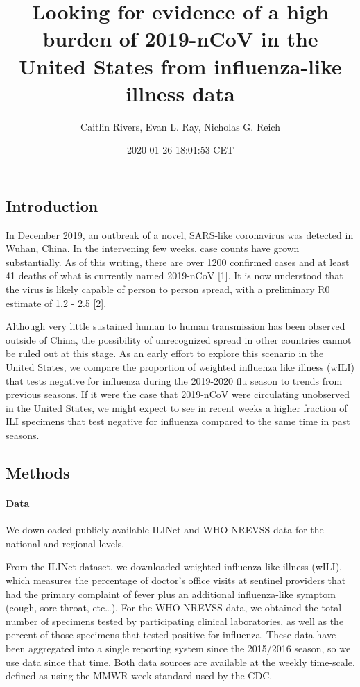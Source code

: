 \documentclass[]{article}
\title{Looking for evidence of a high burden of 2019-nCoV in the United States
from influenza-like illness data}
\author{Caitlin Rivers, Evan L. Ray, Nicholas G. Reich}
\date{2020-01-26 18:01:53 CET}
\let\oldparagraph\paragraph
\renewcommand{\paragraph}[1]{\oldparagraph{#1}\mbox{}}
\begin{document}
\maketitle

\hypertarget{introduction}{%
\subsection{Introduction}\label{introduction}}

In December 2019, an outbreak of a novel, SARS-like coronavirus was
detected in Wuhan, China. In the intervening few weeks, case counts have
grown substantially. As of this writing, there are over 1200 confirmed
cases and at least 41 deaths of what is currently named 2019-nCoV
{[}1{]}. It is now understood that the virus is likely capable of person
to person spread, with a preliminary R0 estimate of 1.2 - 2.5 {[}2{]}.

Although very little sustained human to human transmission has been
observed outside of China, the possibility of unrecognized spread in
other countries cannot be ruled out at this stage. As an early effort to
explore this scenario in the United States, we compare the proportion of
weighted influenza like illness (wILI) that tests negative for influenza
during the 2019-2020 flu season to trends from previous seasons. If it
were the case that 2019-nCoV were circulating unobserved in the United
States, we might expect to see in recent weeks a higher fraction of ILI
specimens that test negative for influenza compared to the same time in
past seasons.

\hypertarget{methods}{%
\subsection{Methods}\label{methods}}

\hypertarget{data}{%
\paragraph{Data}\label{data}}

We downloaded publicly available ILINet and WHO-NREVSS data for the
national and regional levels.

From the ILINet dataset, we downloaded weighted influenza-like illness
(wILI), which measures the percentage of doctor's office visits at
sentinel providers that had the primary complaint of fever plus an
additional influenza-like symptom (cough, sore throat, etc\ldots{}). For
the WHO-NREVSS data, we obtained the total number of specimens tested by
participating clinical laboratories, as well as the percent of those
specimens that tested positive for influenza. These data have been
aggregated into a single reporting system since the 2015/2016 season, so
we use data since that time. Both data sources are available at the
weekly time-scale, defined as using the MMWR week standard used by the
CDC.
\end{document}
